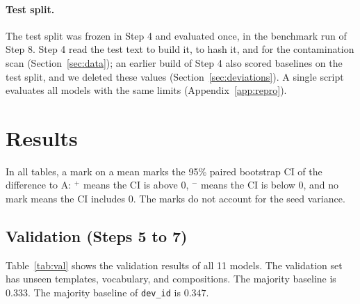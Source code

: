 \documentclass[11pt,a4paper]{article}
\begin{document}
\paragraph{Test split.}
The test split was frozen in Step 4 and evaluated once, in the benchmark run of Step 8.
Step 4 read the test text to build it, to hash it, and for the contamination scan (Section~\ref{sec:data}); an earlier build of Step 4 also scored baselines on the test split, and we deleted these values (Section~\ref{sec:deviations}).
A single script evaluates all models with the same limits (Appendix~\ref{app:repro}).

\section{Results}\label{sec:results}

In all tables, a mark on a mean marks the 95\% paired bootstrap CI of the difference to A: $^{+}$ means the CI is above 0, $^{-}$ means the CI is below 0, and no mark means the CI includes 0.
The marks do not account for the seed variance.

\subsection{Validation (Steps 5 to 7)}\label{sec:valres}

Table~\ref{tab:val} shows the validation results of all 11 models.
The validation set has unseen templates, vocabulary, and compositions.
The majority baseline is $0.333$.
The majority baseline of \texttt{dev\_id} is $0.347$.
\end{document}
